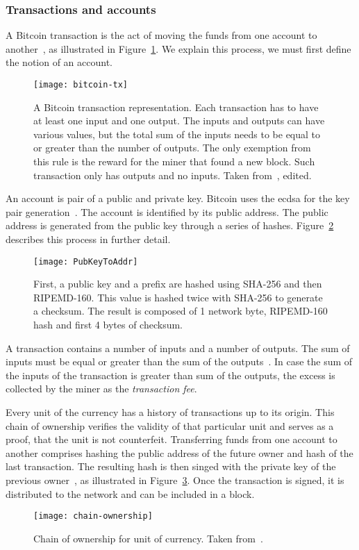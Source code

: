 \subsubsection{Transactions and accounts}
A Bitcoin transaction is the act of moving the funds from one account to another~\cite{Judmayer2017BlocksMechanisms}, as illustrated in Figure~\ref{fig:bitcoin-tx}. We explain this process, we must first define the notion of an account.

\begin{figure}[ht]
    \centering
    \texttt{[image: bitcoin-tx]}
    \caption{A Bitcoin transaction representation. Each transaction has to have at least one input and one output. The inputs and outputs can have various values, but the total sum of the inputs needs to be equal to or greater than the number of outputs. The only exemption from this rule is the reward for the miner that found a new block. Such transaction only has outputs and no inputs. Taken from~\cite{NakamotoBitcoin:System}, edited.}
    \label{fig:bitcoin-tx}
\end{figure}

An account is pair of a public and private key. Bitcoin uses the \acrfull{ecdsa} for the key pair generation~\cite{Decker2013InformationNetwork}. The account is identified by its public address. The public address is generated from the public key through a series of hashes. Figure~\ref{fig:public-address-gen} describes this process in further detail.
% 
\begin{figure}[p]
    \centering
    \texttt{[image: PubKeyToAddr]}
    \caption{First, a public key and a prefix are hashed using SHA-256 and then RIPEMD-160. This value is hashed twice with SHA-256 to generate a checksum. The result is composed of 1 network byte, RIPEMD-160 hash and first 4 bytes of checksum.}
    \label{fig:public-address-gen}
\end{figure}

A transaction contains a number of inputs and a number of outputs. The sum of inputs must be equal or greater than the sum of the outputs~\cite[p. 27]{Judmayer2017BlocksMechanisms}. In case the sum of the inputs of the transaction is greater than sum of the outputs, the excess is collected by the miner as the \textit{transaction fee}.

Every unit of the currency has a history of transactions up to its origin. This chain of ownership verifies the validity of that particular unit and serves as a proof, that the unit is not counterfeit. Transferring funds from one account to another comprises hashing the public address of the future owner and hash of the last transaction. The resulting hash is then singed with the private key of the previous owner~\cite{NakamotoBitcoin:System}, as illustrated in Figure~\ref{fig:chain-ownership}. Once the transaction is signed, it is distributed to the network and can be included in a block.
% 
\begin{figure}[ht]
    \centering
    \texttt{[image: chain-ownership]}
    \caption{Chain of ownership for unit of currency. Taken from~\cite{NakamotoBitcoin:System}.}
    \label{fig:chain-ownership}
\end{figure}

